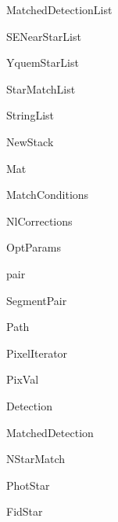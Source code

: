 \begin{CompactList}
\begin{CompactList}
\item {}
\begin{CompactList}
\item Matched\-Detection\-List\item {}
\item SENear\-Star\-List\item Yquem\-Star\-List\end{CompactList}
\item Star\-Match\-List\item String\-List\begin{CompactList}
\item New\-Stack\end{CompactList}
\end{CompactList}
\item Mat\item Match\-Conditions\item {}
\item {}
\item Nl\-Corrections\item Opt\-Params\item pair\begin{CompactList}
\item Segment\-Pair\end{CompactList}
\item Path\item Pixel\-Iterator\item Pix\-Val\item {}
\begin{CompactList}
\item {}
\begin{CompactList}
\item Detection\begin{CompactList}
\item Matched\-Detection\end{CompactList}
\item {}
\item NStar\-Match\item Phot\-Star\begin{CompactList}
\item Fid\-Star\end{CompactList}

\end{CompactList}
\end{CompactList}
\end{CompactList}
